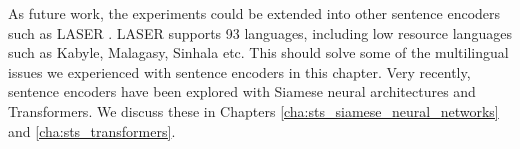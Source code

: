 As future work, the experiments could be extended into other sentence encoders such as LASER \autocite{10.1162/tacl_a_00288}. LASER supports 93 languages, including low resource languages such as Kabyle, Malagasy, Sinhala etc. This should solve some of the multilingual issues we experienced with sentence encoders in this chapter. Very recently, sentence encoders have been explored with Siamese neural architectures and  Transformers. We discuss these in Chapters \ref{cha:sts_siamese_neural_networks} and \ref{cha:sts_transformers}. 

